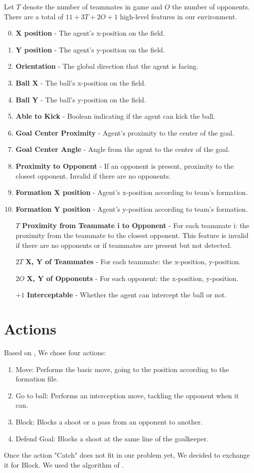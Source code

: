 Let $T$ denote the number of teammates in game and $O$ the
number of opponents. There are a total of $11 + 3T + 2O + 1$ high-level
features in our environment.

\begin{enumerate}[noitemsep]
\setcounter{enumi}{-1}
\item{\textbf{X position} - The agent’s x-position on the field.}
\item{\textbf{Y position} - The agent’s y-position on the field.}
\item{\textbf{Orientation} - The global direction that the agent is facing.}
\item{\textbf{Ball X} - The ball's x-position on the field.}
\item{\textbf{Ball Y} - The ball's y-position on the field.}
\item{\textbf{Able to Kick} - Boolean indicating if the agent can kick the ball.}
\item{\textbf{Goal Center Proximity} - Agent's proximity to the center of the goal.}
\item{\textbf{Goal Center Angle} - Angle from the agent to the center of the goal.}
\item{\textbf{Proximity to Opponent} - If an opponent is present,
  proximity to the closest opponent. Invalid if there are no
  opponents.}
\item{\textbf{Formation X position} - Agent’s x-position according to team's formation.}
\item{\textbf{Formation Y position} - Agent’s y-position according to team's formation.}
\item [$T$] {\textbf{Proximity from Teammate i to Opponent} - For each
  teammate i: the proximity from the teammate to the closest
  opponent. This feature is invalid if there are no opponents or if
  teammates are present but not detected.}
\item [$2T$] {\textbf{X, Y of Teammates} - For each teammate: the x-position, y-position.}
\item [$2O$] {\textbf{X, Y of Opponents} - For each opponent: the x-position, y-position.}
\item [$+1$] {\textbf{Interceptable} - Whether the agent can intercept the ball or
 not.}
\end{enumerate}

\section{Actions}
Based on \cite{cyrus}, We chose four actions:
\begin{enumerate}
    \item Move: Performs the basic move, going to the position according to the formation file.
    \item Go to ball: Performs an interception move, tackling the opponent when it can.
    \item Block: Blocks a shoot or a pass from an opponent to another.
    \item Defend Goal: Blocks a shoot at the same line of the goalkeeper.
\end{enumerate}

Once the action "Catch" does not fit in our problem yet, We decided to exchange it for Block. We used the algorithm of \cite{cyrus2014}.